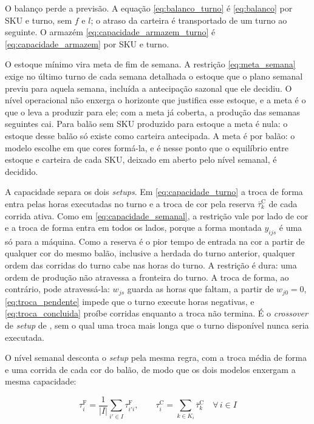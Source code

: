 \documentclass[
    12pt,
    openright,
    oneside,
    a4paper,
    fleqn,
    chapter=TITLE,
    section=TITLE,
    english,
    brazil
]{abntex2}
\begin{document}
O balanço perde a previsão. A equação \eqref{eq:balanco_turno} é \eqref{eq:balanco} por SKU e turno, sem $f$ e $l$; o atraso da carteira é transportado de um turno ao seguinte. O armazém \eqref{eq:capacidade_armazem_turno} é \eqref{eq:capacidade_armazem} por SKU e turno.

O estoque mínimo vira meta de fim de semana. A restrição \eqref{eq:meta_semana} exige no último turno de cada semana detalhada o estoque que o plano semanal previu para aquela semana, incluída a antecipação sazonal que ele decidiu. O nível operacional não enxerga o horizonte que justifica esse estoque, e a meta é o que o leva a produzir para ele; com a meta já coberta, a produção das semanas seguintes cai. Para balão sem SKU produzido para estoque a meta é nula: o estoque desse balão só existe como carteira antecipada. A meta é por balão: o modelo escolhe em que cores formá-la, e é nesse ponto que o equilíbrio entre estoque e carteira de cada SKU, deixado em aberto pelo nível semanal, é decidido.

A capacidade separa os dois \textit{setups}. Em \eqref{eq:capacidade_turno} a troca de forma entra pelas horas executadas no turno e a troca de cor pela reserva $\bar{\tau}^{\mathrm{C}}_k$ de cada corrida ativa. Como em \eqref{eq:capacidade_semanal}, a restrição vale por lado de cor e a troca de forma entra em todos os lados, porque a forma montada $y_{ijs}$ é uma só para a máquina. Como a reserva é o pior tempo de entrada na cor a partir de qualquer cor do mesmo balão, inclusive a herdada do turno anterior, qualquer ordem das corridas do turno cabe nas horas do turno. A restrição é dura: uma ordem de produção não atravessa a fronteira do turno. A troca de forma, ao contrário, pode atravessá-la: $w_{js}$ guarda as horas que faltam, a partir de $w_{j0} = 0$, \eqref{eq:troca_pendente} impede que o turno execute horas negativas, e \eqref{eq:troca_concluida} proíbe corridas enquanto a troca não termina. É o \textit{crossover} de \textit{setup} de , sem o qual uma troca mais longa que o turno disponível nunca seria executada.

O nível semanal desconta o \textit{setup} pela mesma regra, com a troca média de forma e uma corrida de cada cor do balão, de modo que os dois modelos enxergam a mesma capacidade:
\begin{ceqn}
\begin{equation}
\tau^{\mathrm{F}}_{i} = \frac{1}{|I|} \sum_{i' \in I} \tau^{\mathrm{F}}_{i'i}, \qquad \tau^{\mathrm{C}}_{i} = \sum_{k \in K_i} \bar{\tau}^{\mathrm{C}}_{k} \quad \forall\, i \in I
\label{eq:setup_semanal}
\end{equation}
\end{ceqn}
\end{document}
